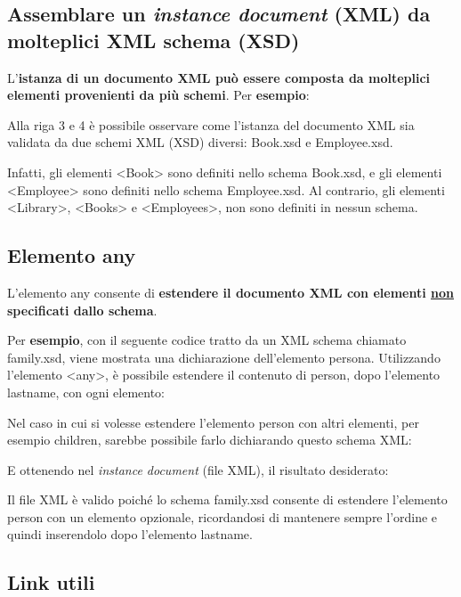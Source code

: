 \documentclass[a4paper]{article}
\begin{document}
	\subsection{Assemblare un \emph{instance document} (XML) da molteplici XML schema (XSD)}
	
	L'\textbf{istanza di un documento XML può essere composta da molteplici elementi provenienti da più schemi}. Per \textcolor{Green4}{\textbf{esempio}}:
	
	Alla riga 3 e 4 è possibile osservare come l'istanza del documento XML sia validata da due schemi XML (XSD) diversi: \textsf{Book.xsd} e \textsf{Employee.xsd}.
	
	Infatti, gli elementi \textsf{<Book>} sono definiti nello schema \textsf{Book.xsd}, e gli elementi \textsf{<Employee>} sono definiti nello schema \textsf{Employee.xsd}. Al contrario, gli elementi \textsf{<Library>}, \textsf{<Books>} e \textsf{<Employees>}, non sono definiti in nessun schema.\newpage
	
	\subsection{Elemento \textsf{any}}
	
	L'elemento \textcolor{Red3}{\textsf{any}} consente di \textbf{estendere il documento XML con elementi \underline{non} specificati dallo schema}.\newline
	
	\noindent
	Per \textcolor{Green4}{\textbf{esempio}}, con il seguente codice tratto da un XML schema chiamato \textsf{family.xsd}, viene mostrata una dichiarazione dell'elemento \textsf{persona}. Utilizzando l'elemento \textsf{<any>}, è possibile estendere il contenuto di \textsf{person}, dopo l'elemento \textsf{lastname}, con ogni elemento:
	
	Nel caso in cui si volesse estendere l'elemento \textsf{person} con altri elementi, per esempio \textsf{children}, sarebbe possibile farlo dichiarando questo schema XML:
	
	E ottenendo nel \emph{instance document} (file XML), il risultato desiderato:
	
	Il file XML è valido  poiché lo schema \textsf{family.xsd} consente di estendere l'elemento \textsf{person} con un elemento opzionale, ricordandosi di mantenere sempre l'ordine e quindi inserendolo dopo l'elemento \textsf{lastname}.\newpage
	
	\subsection{Link utili}
	
\end{document}

